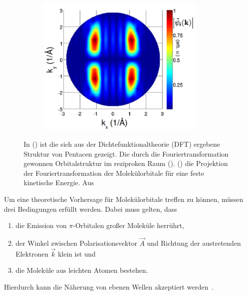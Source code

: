 \begin{figure}
\begin{subfigure}{0.3\textwidth}
                \caption{}
                \label{fig:DFT2}
            \end{subfigure}
            \begin{subfigure}{0.3\textwidth}
                \centering
                \includegraphics[width=0.9\textwidth]{DFT3.PNG}
                \caption{}
                \label{fig:DFT3}
            \end{subfigure}
            \caption{In () ist die sich aus der Dichtefunktionaltheorie (DFT) ergebene Struktur von Pentacen gezeigt.
            Die durch die Fouriertransformation gewonnen Orbitalstruktur im reziproken Raum ().
            () die Projektion der Fouriertransformation der Molekülorbitale für eine feste kinetische Energie.
            Aus~\cite{MM_2}}
            \label{fig:DFT}
        \end{figure}
        Um eine theoretische Vorhersage für Molekülorbitale treffen zu können, müssen drei Bedingungen erfüllt werden.
        Dabei muss gelten, dass
        \begin{enumerate}
            \item die Emission von $\pi$-Orbitalen großer Moleküle herrührt,
            \item der Winkel zwischen Polarisationsvektor $\vec{A}$ und Richtung der austretenden Elektronen $\vec{k}$ klein ist und
            \item die Moleküle aus leichten Atomen bestehen.
        \end{enumerate}
        Hierdurch kann die Näherung von ebenen Wellen akzeptiert werden~\cite{MM_2}.
